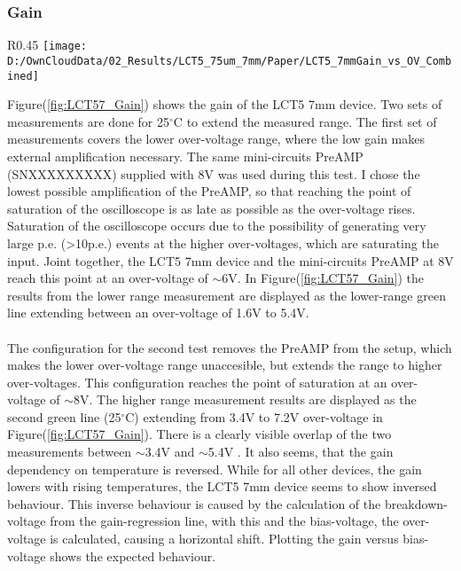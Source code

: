 \documentclass[article,type=msc,colorback,accentcolor=tud9c]{tudthesis}
\begin{document}
\subsubsection{Gain}
\label{subsubsec:LCT57Gain}
\begin{wrapfigure}{R}{0.45\textwidth}
\centering
\texttt{[image: D:/OwnCloudData/02\_Results/LCT5\_75um\_7mm/Paper/LCT5\_7mmGain\_vs\_OV\_Combined]}
\caption{\label{fig:LCT57_Gain}Gain of the HPK LCT5 7mm pixel}
\end{wrapfigure}
Figure(\ref{fig:LCT57_Gain}) shows the gain of the LCT5 7mm device. Two sets of measurements are done for 25$^\circ$C to extend the measured range. The first set of measurements covers the lower over-voltage range, where the low gain makes external amplification necessary. The same mini-circuits PreAMP (SNXXXXXXXXX) supplied with 8V was used during this test. I chose the lowest possible amplification of the PreAMP, so that reaching the point of saturation of the oscilloscope is as late as possible as the over-voltage rises. Saturation of the oscilloscope occurs due to the possibility of generating very large p.e. (>10p.e.) events at the higher over-voltages, which are saturating the input. Joint together, the LCT5 7mm device and the mini-circuits PreAMP at 8V reach this point at an over-voltage of $\sim$6V. In Figure(\ref{fig:LCT57_Gain}) the results from the lower range measurement are displayed as the lower-range green line extending between an over-voltage of 1.6V to 5.4V.
\\\\
The configuration for the second test removes the PreAMP from the setup, which makes the lower over-voltage range unaccesible, but extends the range to higher over-voltages. This configuration reaches the point of saturation at an over-voltage of $\sim$8V. The higher range measurement results are displayed as the second green line (25$^\circ$C) extending from 3.4V to 7.2V over-voltage in Figure(\ref{fig:LCT57_Gain}). There is a clearly visible overlap of the two measurements between $\sim$3.4V and $\sim$5.4V . It also seems, that the gain dependency on temperature is reversed. While for all other devices, the gain lowers with rising temperatures, the LCT5 7mm device seems to show inversed behaviour. This inverse behaviour is caused by the calculation of the breakdown-voltage from the gain-regression line, with this and the bias-voltage, the over-voltage is calculated, causing a horizontal shift. Plotting the gain versus bias-voltage shows the expected behaviour.
\end{document}
